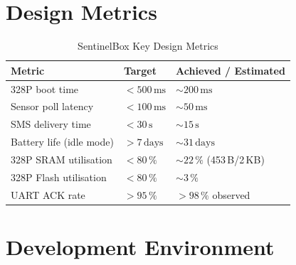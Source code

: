 \documentclass[12pt,a4paper]{article}
\begin{document}
\section{Design Metrics}

\begin{table}[H]
\centering
\begin{tabular}{@{} L{5cm} L{3.5cm} L{4cm} @{}}
\toprule
\textbf{Metric}             & \textbf{Target}        & \textbf{Achieved / Estimated} \\
\midrule
328P boot time              & $< 500\,\text{ms}$     & $\sim 200\,\text{ms}$         \\
Sensor poll latency         & $< 100\,\text{ms}$     & $\sim 50\,\text{ms}$          \\
SMS delivery time           & $< 30\,\text{s}$       & $\sim 15\,\text{s}$           \\
Battery life (idle mode)    & $> 7\,\text{days}$     & $\sim 31\,\text{days}$        \\
328P SRAM utilisation       & $< 80\,\%$             & $\sim 22\,\%$ (453\,B/2\,KB)  \\
328P Flash utilisation      & $< 80\,\%$             & $\sim 3\,\%$                  \\
UART ACK rate               & $> 95\,\%$             & $> 98\,\%$ observed           \\
\bottomrule
\end{tabular}
\caption{SentinelBox Key Design Metrics}
\end{table}

\section{Development Environment}
\end{document}
